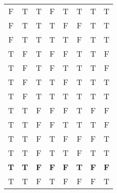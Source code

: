 \documentclass{article}
\begin{document}
\begin{landscape}
\begin{tabular}{|c|c|c|c|c|c|c|c|}
        F          & T          & T          & F          & T          & T                        & T                        & T                                \\
        F          & T          & T          & T          & F          & F                        & T                        & T                                \\
        F          & T          & T          & T          & T          & F                        & T                        & T                                \\
        T          & F          & T          & F          & F          & T                        & T                        & F                                \\
        T          & F          & T          & F          & T          & T                        & T                        & F                                \\
        T          & F          & T          & T          & F          & T                        & T                        & T                                \\
        T          & F          & T          & T          & T          & T                        & T                        & T                                \\
        T          & T          & F          & F          & F          & T                        & F                        & F                                \\
        T          & T          & F          & F          & T          & T                        & T                        & F                                \\
        T          & T          & F          & T          & F          & F                        & F                        & T                                \\
        T          & T          & F          & T          & T          & F                        & T                        & T                                \\
        \hline
        \textbf{T} & \textbf{T} & \textbf{F} & \textbf{F} & \textbf{F} & \textbf{T} & \textbf{F} & \textbf{F} \\
        T & T & F & T & F & F & F & T \\
        \hline
    \end{tabular}\\
    \normalsize

\end{landscape}
\end{document}
